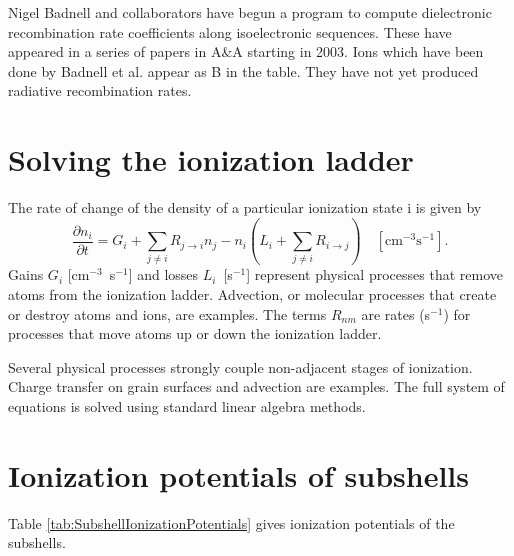Nigel Badnell and collaborators have begun a program to compute
dielectronic recombination rate coefficients along isoelectronic sequences.
These have appeared in a series of papers in A\&A starting in 2003.  Ions
which have been done by Badnell et al. appear as B in the table.  They have
not yet produced radiative recombination rates.

\section{Solving the ionization ladder }

   The rate of change of the density of a particular ionization state i
is given by
\begin{equation}
\frac{{\partial {n_i}}}{{\partial t}} = {G_i} + \sum\limits_{j \ne i}
{{R_{j \to i}}{n_j}}  - {n_i}\left( {{L_i} + \sum\limits_{j \ne i} {{R_{i
\to j}}} } \right)\quad
[\mathrm{cm}^{-3} \mathrm{s}^{-1}].%
\end{equation}
Gains $G_i$ [cm$^{-3}$~s$^{-1}$] and losses $L_i$~[s$^{-1}$] represent physical processes that
remove atoms from the ionization ladder.  Advection, or molecular processes
that create or destroy atoms and ions, are examples.  The terms $R_{nm}$ are
rates (s$^{-1}$) for processes that move atoms up or down the ionization ladder.

Several physical processes strongly couple
non-adjacent stages of ionization.  Charge transfer on grain surfaces and
advection are examples.  The full system of equations is solved using standard
linear algebra methods.

\section{Ionization potentials of subshells}

Table \ref{tab:SubshellIonizationPotentials} gives ionization potentials
of the subshells.

